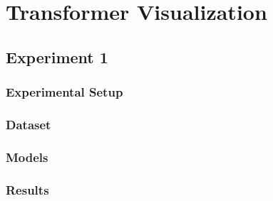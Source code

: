 
\section{Transformer Visualization}

\subsection{Experiment 1}

\subsubsection{Experimental Setup}
\subsubsection{Dataset}
\subsubsection{Models}

\subsubsection{Results}

